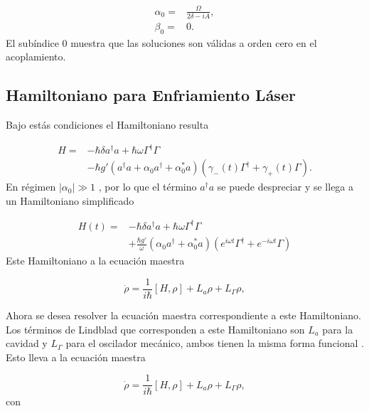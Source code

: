 \documentclass[10pt,a4paper]{report}
\begin{document}
\begin{align}
\alpha_0 =& \frac{\Omega}{2\delta-iA},\\
\beta_0 =& 0.
\end{align} El subíndice 0 muestra que las soluciones son válidas a orden cero en el acoplamiento.

\subsection{Hamiltoniano para Enfriamiento Láser}

Bajo estás condiciones  el Hamiltoniano resulta

\begin{align}
H =& -\hbar \delta a^{\dagger}a +\hbar\omega\Gamma^{\dagger}\Gamma \\
&-\hbar g'(a^{\dagger}a +\alpha_0 a^{\dagger}+\alpha^*_0 a)(\gamma_-(t)\Gamma^{\dagger}+\gamma_+(t)\Gamma)\nonumber.
\end{align}
En  régimen $|\alpha_0| \gg 1$
\cite{BarberisLC}, por lo que el término $a^\dagger a$ se puede
despreciar y se llega a un Hamiltoniano simplificado

\begin{align} \label{LCHamiltonian}
H(t) =& -\hbar \delta a^{\dagger}a +\hbar\omega\Gamma^{\dagger}\Gamma \\
&+\frac{\hbar g'}{\omega}(\alpha_0 a^{\dagger}+\alpha^*_0 a)(e^{i\omega t} \nonumber\Gamma^{\dagger}+e^{-i\omega t}\Gamma)
\end{align}
Este Hamiltoniano  a la ecuación maestra


\begin{equation}\label{LCMasterEq}
\dot{\rho} = \frac{1}{i\hbar}[H,\rho] +L_a\rho + L_\Gamma \rho,
\end{equation} 

Ahora se desea resolver la ecuación maestra correspondiente a este Hamiltoniano. Los términos de Lindblad que corresponden a este Hamiltoniano son $L_a$ para la cavidad y $L_\Gamma$ para el oscilador mecánico, ambos tienen la misma forma funcional \cite{ZollerQN}. Esto lleva a la ecuación maestra

\begin{equation}\label{LCMasterEquation}
\dot{\rho} = \frac{1}{i\hbar}[H,\rho] + L_a\rho + L_\Gamma \rho,
\end{equation} con
\end{document}
